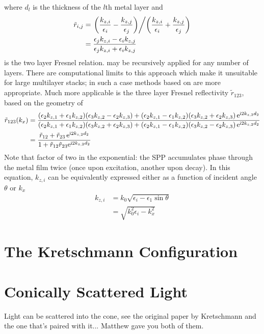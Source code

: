 \documentclass[a4paper,titlepage,onecolumn]{report}
\begin{document}
where $d_l$ is the thickness of the $l$th metal layer and 
\begin{align}
\tilde{r}_{i,j}&=
\left.\left(\frac{k_{z,i}}{\epsilon_i}-\frac{k_{z,j}}{\epsilon_j}\right)
\middle/
\left(\frac{k_{z,i}}{\epsilon_i}+\frac{k_{z,j}}{\epsilon_j}\right)\right.\\
&=\frac{\epsilon_j k_{z,i}-\epsilon_i k_{z,j}}
{\epsilon_j k_{z,i}+\epsilon_i k_{z,j}}
\end{align}
is the two layer Fresnel relation.   may be
recursively applied for any number of layers.  There are computational limits to this approach which make it unsuitable for large multilayer stacks; in such a case methods based on  are more appropriate.  Much more applicable is the three layer Fresnel reflectivity $\tilde{r}_{123}$, based on
the geometry of 
\begin{align}
\tilde{r}_{123}(k_x) &=
\frac{
  (\epsilon_2 k_{z,1}+\epsilon_1 k_{z,2})(\epsilon_3 k_{z,2}-\epsilon_2 k_{z,3})
+ (\epsilon_2 k_{z,1}-\epsilon_1 k_{z,2})(\epsilon_3 k_{z,2}+\epsilon_2 k_{z,3})\,
{\mathrm{e}}^{{\mathrm{i}} 2 k_{z,2} d_2}
}
{
  (\epsilon_2 k_{z,1}+\epsilon_1 k_{z,2})(\epsilon_3 k_{z,2}+\epsilon_2 k_{z,3})
+ (\epsilon_2 k_{z,1}-\epsilon_1 k_{z,2})(\epsilon_3 k_{z,2}-\epsilon_2 k_{z,3})\,
{\mathrm{e}}^{{\mathrm{i}} 2 k_{z,2} d_2}
}\\
&=
\frac{\tilde{r}_{12}+\tilde{r}_{23}\, {\mathrm{e}}^{{\mathrm{i}} 2 k_{z,2} d_2}} {1+\tilde{r}_{12} \tilde{r}_{23} {\mathrm{e}}^{{\mathrm{i}} 2 k_{z,2} d_2}}
\label{eqn:fresnel123}
\end{align}
Note that factor of two in the exponential: the SPP accumulates phase
through the metal film twice (once upon excitation, another upon decay).
In this equation, $k_{z,i}$ can be equivalently expressed either as a
function of incident angle $\theta$ or $k_x$
\begin{align}
k_{z,i} &= k_0 \sqrt{\epsilon_i - \epsilon_1 \sin \theta}\\
&= \sqrt{k_0^2\epsilon_i - k_x^2}
\end{align}\begin{flushleft}\begin{center}\end{center}\end{flushleft}
\section{The Kretschmann Configuration}
\section{Conically Scattered Light}
Light can be scattered into the cone, see the original paper by Kretschmann and the one that's paired with it... Matthew gave you both of them.
\end{document}
